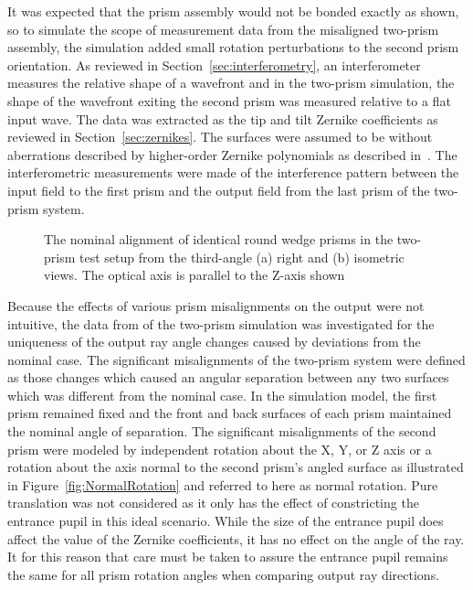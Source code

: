 It was expected that the prism assembly would not be bonded exactly as shown, so to simulate the scope of measurement data from the misaligned two-prism
assembly, the simulation added small rotation perturbations to the second prism orientation. As reviewed in Section~\ref{sec:interferometry}, an interferometer measures the relative shape of a wavefront and in the two-prism simulation, the shape of the wavefront exiting the second prism was measured relative to a flat input wave. The data was extracted as the tip and tilt Zernike coefficients as reviewed in Section~\ref{sec:zernikes}. The surfaces were assumed to be without aberrations described by higher-order Zernike polynomials as described in~\cite{Wyant}. The interferometric measurements were made of the interference pattern between the input field to the first prism and the output field from the last prism of the two-prism system.

\begin{figure}[H]  %
\begin{center}
\caption{The nominal alignment of identical round wedge prisms in the two-prism test setup from the third-angle (a) right and (b) isometric views. The optical axis is parallel to the Z-axis shown}
\label{fig:Two_Prisms_Nominal}
\end{center}
\end{figure}

Because the effects of various prism misalignments on the output were not intuitive, the data from of the two-prism simulation was investigated for the uniqueness of the output ray angle changes caused by deviations from the nominal case. The significant misalignments of the two-prism system were defined as those changes which caused an angular separation between any two surfaces which was different from the nominal case. In the simulation model, the first prism remained fixed and the front and back surfaces of each prism maintained the nominal angle of separation. The significant misalignments of the second prism were modeled by independent rotation about the X, Y, or Z axis or a rotation about the axis normal to the second prism's angled surface as illustrated in Figure~\ref{fig:NormalRotation} and referred to here as normal rotation. Pure translation was not considered as it only has the effect of constricting the entrance pupil in this ideal scenario. While the size of the entrance pupil does affect the value of the Zernike coefficients, it has no effect on the angle of the ray. It for this reason that care must be taken to assure the entrance pupil remains the same for all prism rotation angles when comparing output ray directions.

